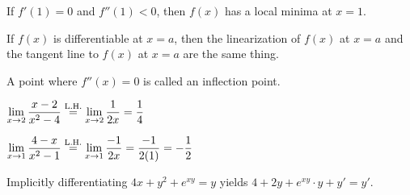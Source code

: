 \documentclass[11pt,letterpaper]{article}
\begin{document}
 If $f'(1)= 0$ and $f''(1) < 0$, then $f(x)$ has a local minima at $x= 1$. \pspace

 If $f(x)$ is differentiable at $x= a$, then the linearization of $f(x)$ at $x= a$ and the tangent line to $f(x)$ at $x= a$ are the same thing. \pspace

  A point where $f''(x)= 0$ is called an inflection point. \pspace



 $\displaystyle\lim_{x \to 2} \dfrac{x - 2}{x^2 - 4} \stackrel{\text{L.H.}}{=} \lim_{x \to 2} \dfrac{1}{2x}= \dfrac{1}{4}$



 $\displaystyle\lim_{x \to 1} \dfrac{4 - x}{x^2 - 1} \stackrel{\text{L.H.}}{=} \lim_{x \to 1} \dfrac{-1}{2x}= \dfrac{-1}{2(1)}= -\dfrac{1}{2}$





 Implicitly differentiating $4x + y^2 + e^{xy}= y$ yields $4 + 2y + e^{xy} \cdot y + y' = y'$.
\end{document}

